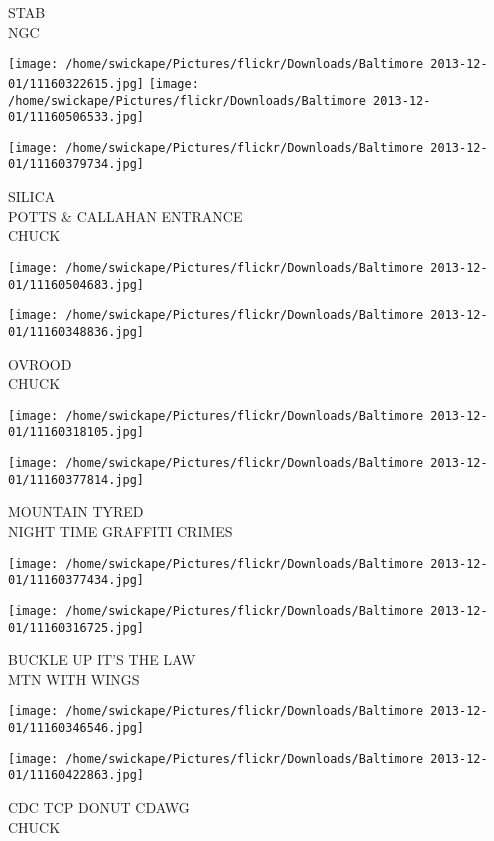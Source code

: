 \documentclass[10pt,letterpaper]{article}
\begin{document}
STAB\\
NGC
\pagebreak

\texttt{[image: /home/swickape/Pictures/flickr/Downloads/Baltimore 2013-12-01/11160322615.jpg]}
\texttt{[image: /home/swickape/Pictures/flickr/Downloads/Baltimore 2013-12-01/11160506533.jpg]}

\texttt{[image: /home/swickape/Pictures/flickr/Downloads/Baltimore 2013-12-01/11160379734.jpg]}

SILICA\\
POTTS \& CALLAHAN ENTRANCE\\
CHUCK
\pagebreak

\texttt{[image: /home/swickape/Pictures/flickr/Downloads/Baltimore 2013-12-01/11160504683.jpg]}

\vspace{0.25in}
\texttt{[image: /home/swickape/Pictures/flickr/Downloads/Baltimore 2013-12-01/11160348836.jpg]}

OVROOD\\
CHUCK
\pagebreak

\texttt{[image: /home/swickape/Pictures/flickr/Downloads/Baltimore 2013-12-01/11160318105.jpg]}

\vspace{0.25in}
\texttt{[image: /home/swickape/Pictures/flickr/Downloads/Baltimore 2013-12-01/11160377814.jpg]}

MOUNTAIN TYRED\\
NIGHT TIME GRAFFITI CRIMES
\pagebreak

\texttt{[image: /home/swickape/Pictures/flickr/Downloads/Baltimore 2013-12-01/11160377434.jpg]}

\vspace{0.25in}
\texttt{[image: /home/swickape/Pictures/flickr/Downloads/Baltimore 2013-12-01/11160316725.jpg]}

BUCKLE UP IT'S THE LAW\\
MTN WITH WINGS
\pagebreak

\texttt{[image: /home/swickape/Pictures/flickr/Downloads/Baltimore 2013-12-01/11160346546.jpg]}

\vspace{0.25in}
\texttt{[image: /home/swickape/Pictures/flickr/Downloads/Baltimore 2013-12-01/11160422863.jpg]}

CDC TCP DONUT CDAWG\\
CHUCK
\pagebreak
\end{document}
